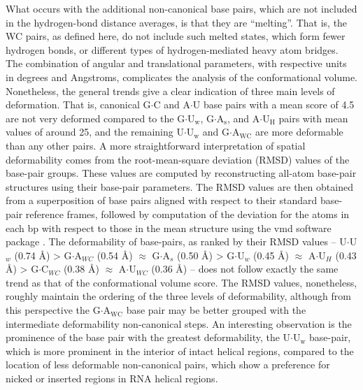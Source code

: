 What occurs  with the additional  non-canonical base pairs,  which are
not included in the hydrogen-bond  distance averages, is that they are
``melting''. That  is, the WC pairs,  as defined here,  do not include
such  melted states,  which form  fewer hydrogen  bonds,  or different
types  of hydrogen-mediated  heavy atom  bridges.  The  combination of
angular and translational parameters, with respective units in degrees
and Angstroms, complicates the  analysis of the conformational volume.
Nonetheless, the general trends give  a clear indication of three main
levels  of deformation.   That is,  canonical G$\cdot$C  and A$\cdot$U
base pairs with a mean score  of 4.5 are not very deformed compared to
the      G$\cdot$U$_{\text{w}}$,      G$\cdot$A$_{\text{s}}$,      and
A$\cdot$U$_{\text{H}}$ pairs  with mean values  of around 25,  and the
remaining U$\cdot$U$_{\text{w}}$  and G$\cdot$A$_{\text{WC}}$ are more
deformable   than   any   other   pairs.    A   more   straightforward
interpretation    of   spatial    deformability    comes   from    the
root-mean-square deviation (RMSD) values of the base-pair groups. These values
are  computed by  reconstructing all-atom base-pair  structures using
their base-pair parameters.  The RMSD  values are then obtained from a
superposition of base pairs aligned with respect to their
standard base-pair reference frames,  followed by computation  of the
deviation for the  atoms in each bp with respect to  those in the mean
structure using the vmd software package \cite{eargle2006}.  The
deformability of base-pairs, as ranked by their RMSD values --
U$\cdot$U$_{w}$  (0.74 \AA)  > G$\cdot$A$_{WC}$  (0.54  \AA) $\approx$
G$\cdot$A$_{s}$  (0.50  \AA) >  G$\cdot$U$_{w}$  (0.45 \AA)  $\approx$
A$\cdot$U$_{H}$  (0.43 \AA)  > G$\cdot$C$_{WC}$  (0.38  \AA) $\approx$
A$\cdot$U$_{WC}$ (0.36 \AA) -- does not follow exactly the same trend as
that of the conformational  volume score.  The RMSD values, nonetheless,
roughly maintain  the ordering of  the three levels  of deformability,
although from  this perspective the  G$\cdot$A$_{\text{WC}}$ base pair
may   be   better   grouped   with  the   intermediate   deformability
non-canonical steps.  An interesting  observation is the prominence of
the base pair with the greatest deformability, the
U$\cdot$U$_{\text{w}}$ base-pair, which is more prominent in the interior of
intact helical  regions, compared to  the location of  less deformable
non-canonical pairs,  which show a  preference for nicked  or inserted
regions in RNA helical regions.


